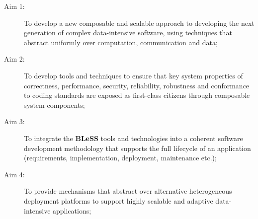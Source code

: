 \documentclass[a4paper,11pt]{article}
\newcommand{\project}[1]{\textbf{#1}\xspace}
\newcommand{\BLESS}{\project{BLeSS}}
\newcommand{\TheProject}{\BLESS}
\begin{document}
\begin{description}
\item[Aim 1:]

\noindent
   To develop a new composable and scalable
   approach to developing the next generation of complex data-intensive software, using techniques that abstract uniformly over computation, communication and data;


\item[Aim 2:]

\noindent
  To develop tools and techniques to ensure that key system properties of correctness, performance, security, reliability, robustness and conformance to coding standards
  are exposed as first-class citizens through composable system components;

\item[Aim 3:]
   \noindent
   To integrate the \TheProject{} tools and technologies into a coherent software development methodology that
   supports the full lifecycle of an application (requirements, implementation, deployment, maintenance etc.);


\item[Aim 4:]
   \noindent
   To provide mechanisms that abstract over alternative heterogeneous deployment platforms to support highly scalable and adaptive data-intensive applications;


\end{description}
\end{document}

